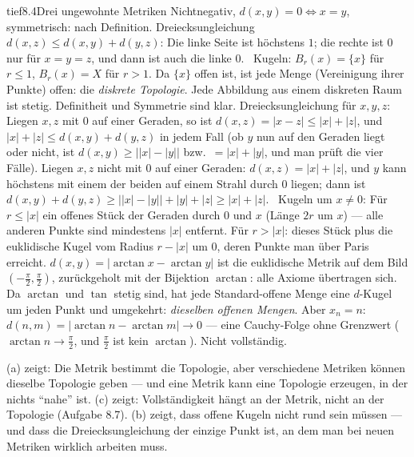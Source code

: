 \begin{loesungkarte}{tief}{8.4}{Drei ungewohnte Metriken}
Nichtnegativ, $d(x, y) = 0\iff x = y$, symmetrisch: nach Definition. Dreiecksungleichung $d(x, z)\le d(x, y) + d(y, z)$: Die linke Seite ist höchstens $1$; die rechte ist $0$ nur für $x = y = z$, und dann ist auch die linke $0$. \checkmark\ Kugeln: $B_r(x) = \{x\}$ für $r\le1$, $B_r(x) = X$ für $r > 1$. Da $\{x\}$ offen ist, ist jede Menge (Vereinigung ihrer Punkte) offen: die \emph{diskrete Topologie}. Jede Abbildung aus einem diskreten Raum ist stetig.
Definitheit und Symmetrie sind klar. Dreiecksungleichung für $x, y, z$: Liegen $x, z$ mit $0$ auf einer Geraden, so ist $d(x, z) = |x - z|\le|x| + |z|$, und $|x| + |z|\le d(x, y) + d(y, z)$ in jedem Fall (ob $y$ nun auf den Geraden liegt oder nicht, ist $d(x, y)\ge\bigl||x| - |y|\bigr|$ bzw.\ $= |x| + |y|$, und man prüft die vier Fälle). Liegen $x, z$ nicht mit $0$ auf einer Geraden: $d(x, z) = |x| + |z|$, und $y$ kann höchstens mit einem der beiden auf einem Strahl durch $0$ liegen; dann ist $d(x, y) + d(y, z)\ge\bigl||x| - |y|\bigr| + |y| + |z|\ge|x| + |z|$. \checkmark\ Kugeln um $x\neq0$: Für $r\le|x|$ ein offenes Stück der Geraden durch $0$ und $x$ (Länge $2r$ um $x$) --- alle anderen Punkte sind mindestens $|x|$ entfernt. Für $r > |x|$: dieses Stück plus die euklidische Kugel vom Radius $r - |x|$ um $0$, deren Punkte man über Paris erreicht.
$d(x, y) = |\arctan x - \arctan y|$ ist die euklidische Metrik auf dem Bild $(-\frac\pi2, \frac\pi2)$, zurückgeholt mit der Bijektion $\arctan$: alle Axiome übertragen sich. Da $\arctan$ und $\tan$ stetig sind, hat jede Standard-offene Menge eine $d$-Kugel um jeden Punkt und umgekehrt: \emph{dieselben offenen Mengen}. Aber $x_n = n$: $d(n, m) = |\arctan n - \arctan m|\to0$ --- eine Cauchy-Folge ohne Grenzwert ($\arctan n\to\frac\pi2$, und $\frac\pi2$ ist kein $\arctan$). Nicht vollständig.
\begin{mitnehmen}\kastentext
(a) zeigt: Die Metrik bestimmt die Topologie, aber verschiedene Metriken können dieselbe Topologie geben --- und eine Metrik kann eine Topologie erzeugen, in der nichts \enquote{nahe} ist. (c) zeigt: Vollständigkeit hängt an der Metrik, nicht an der Topologie (Aufgabe 8.7). (b) zeigt, dass offene Kugeln nicht rund sein müssen --- und dass die Dreiecksungleichung der einzige Punkt ist, an dem man bei neuen Metriken wirklich arbeiten muss.
\end{mitnehmen}
\end{loesungkarte}

